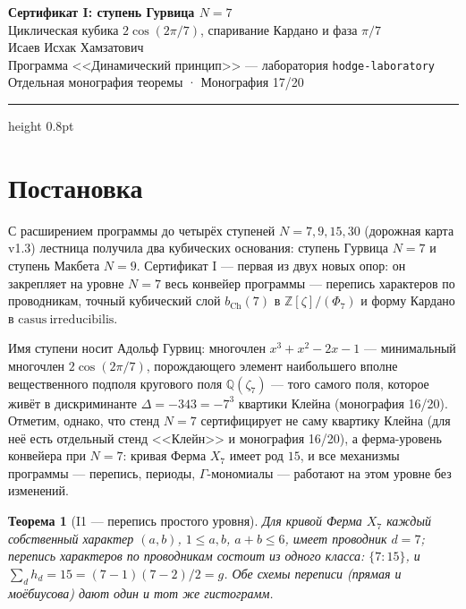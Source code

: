 \documentclass[11pt,a4paper]{article}
\theoremstyle{plain}
\newtheorem{theorem}{Теорема}
\theoremstyle{definition}
\theoremstyle{remark}
\newcommand{\ZZ}{\mathbb{Z}}
\newcommand{\QQ}{\mathbb{Q}}
\newcommand{\Ga}{\Gamma}
\begin{document}
\begin{center}
{\LARGE\bfseries Сертификат I: ступень Гурвица $N=7$}\\[0.4em]
{\large Циклическая кубика $2\cos(2\pi/7)$, спаривание Кардано и фаза $\pi/7$}\\[0.6em]
{\normalsize Исаев Исхак Хамзатович}\\[0.2em]
{\small Программа <<Динамический принцип>> --- лаборатория \texttt{hodge-laboratory}}\\[0.15em]
{\small Отдельная монография теоремы · Монография 17/20}
\end{center}
\vspace{0.4em}
{\color{linkblue}\hrule height 0.8pt}
\vspace{0.8em}

\section{Постановка}

С расширением программы до четырёх ступеней $N=7,9,15,30$ (дорожная
карта v1.3) лестница получила два кубических основания: ступень
Гурвица $N=7$ и ступень Макбета $N=9$. Сертификат I --- первая из
двух новых опор: он закрепляет на уровне $N=7$ весь конвейер
программы --- перепись характеров по проводникам, точный
кубический слой $b_{\mathrm{Ch}}(7)$ в $\ZZ[\zeta]/(\Phi_7)$ и
форму Кардано в $\mathrm{casus\ irreducibilis}$.

Имя ступени носит Адольф Гурвиц: многочлен $x^3+x^2-2x-1$ ---
минимальный многочлен $2\cos(2\pi/7)$, порождающего элемент
наибольшего вполне вещественного подполя кругового поля
$\QQ(\zeta_7)$ --- того самого поля, которое живёт в дискриминанте
$\Delta=-343=-7^3$ квартики Клейна (монография 16/20). Отметим,
однако, что стенд $N=7$ сертифицирует не саму квартику Клейна
(для неё есть отдельный стенд <<Клейн>> и монография 16/20), а
ферма-уровень конвейера при $N=7$: кривая Ферма $X_7$ имеет род
$15$, и все механизмы программы --- перепись, периоды,
$\Ga$-мономиалы --- работают на этом уровне без изменений.

\begin{theorem}[I1 --- перепись простого уровня]\label{th:I1}
Для кривой Ферма $X_7$ каждый собственный характер $(a,b)$,
$1\le a,b$, $a+b\le 6$, имеет проводник $d=7$; перепись
характеров по проводникам состоит из одного класса:
$\{7\colon 15\}$, и $\sum_d h_d = 15 = (7-1)(7-2)/2 = g$.
Обе схемы переписи (прямая и моёбиусова) дают один и тот же
гистограмм.
\end{theorem}
\end{document}
